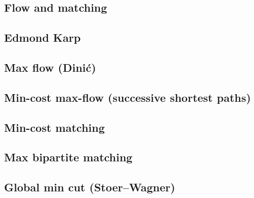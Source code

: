 \documentclass[9pt]{extarticle}
\begin{document}
\begin{multicols*}{3}
\setlength{\parskip}{0.0in}
\tableofcontents
\setlength{\parskip}{0.1in}
\section{Flow and matching}

\subsection{Edmond Karp}


\subsection{Max flow (Dini\'c)} %


\subsection{Min-cost max-flow (successive shortest paths)}


\subsection{Min-cost matching} %


\subsection{Max bipartite matching} %


\subsection{Global min cut (Stoer--Wagner)} %



\end{multicols*}
\end{document}
